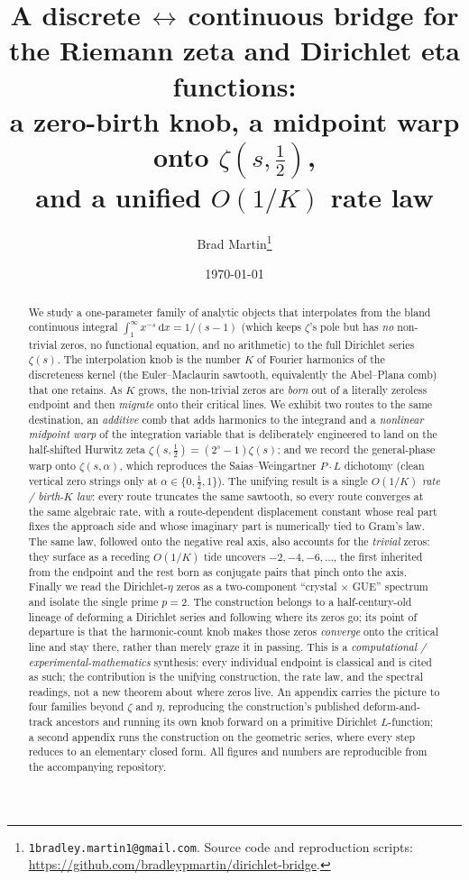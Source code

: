 \documentclass[11pt]{article}
\title{\bfseries A discrete\,$\leftrightarrow$\,continuous bridge for the
Riemann zeta and Dirichlet eta functions:\\
a zero-birth knob, a midpoint warp onto $\zeta(s,\tfrac12)$,\\
and a unified $O(1/K)$ rate law}
\author{Brad Martin\thanks{\texttt{1bradley.martin1@gmail.com}. Source code
and reproduction scripts: \url{https://github.com/bradleypmartin/dirichlet-bridge}.}}
\date{\today}
\theoremstyle{definition}
\newcommand{\dd}{\mathrm{d}}
\begin{document}
\maketitle

\begin{abstract}
We study a one-parameter family of analytic objects that interpolates from the
bland continuous integral $\int_1^\infty x^{-s}\,\dd x = 1/(s-1)$ (which keeps
$\zeta$'s pole but has \emph{no} non-trivial zeros, no functional equation, and no
arithmetic) to the full Dirichlet series $\zeta(s)$. The interpolation knob is
the number $K$ of Fourier harmonics of the discreteness kernel (the
Euler--Maclaurin sawtooth, equivalently the Abel--Plana comb) that one retains.
As $K$ grows, the non-trivial zeros are \emph{born} out of a literally zeroless
endpoint and then \emph{migrate} onto their critical lines. We exhibit two
routes to the same destination, an \emph{additive} comb that adds harmonics to
the integrand and a \emph{nonlinear midpoint warp} of the integration variable
that is deliberately engineered to land on the half-shifted Hurwitz zeta
$\zeta(s,\tfrac12) = (2^s-1)\zeta(s)$; and we record the general-phase warp
onto $\zeta(s,\alpha)$, which reproduces the Saias--Weingartner $P\cdot L$
dichotomy (clean vertical zero strings only at $\alpha\in\{0,\tfrac12,1\}$). The
unifying result is a single \emph{$O(1/K)$ rate / birth-$K$ law}: every route
truncates the same sawtooth, so every route converges at the same algebraic rate,
with a route-dependent displacement constant whose real part fixes the approach
side and whose imaginary part is numerically tied to Gram's law. The same law,
followed onto the negative real axis, also accounts for the \emph{trivial} zeros:
they surface as a receding $O(1/K)$ tide uncovers $-2,-4,-6,\dots$, the first
inherited from the endpoint and the rest born as conjugate pairs that pinch onto
the axis. Finally we read
the Dirichlet-$\eta$ zeros as a two-component ``crystal $\times$ GUE'' spectrum
and isolate the single prime $p=2$. The construction belongs to a half-century-old
lineage of deforming a Dirichlet series and following where its zeros go; its point
of departure is that the harmonic-count knob makes those zeros \emph{converge} onto
the critical line and stay there, rather than merely graze it in passing. This is a
\emph{computational / experimental-mathematics} synthesis: every individual endpoint
is classical and is cited as such; the contribution is the unifying construction, the
rate law, and the spectral readings, not a new theorem about where zeros live. An
appendix carries the picture to four families beyond $\zeta$ and $\eta$, reproducing
the construction's published deform-and-track ancestors and running its own knob
forward on a primitive Dirichlet $L$-function; a second appendix runs the
construction on the geometric series, where every step reduces to an elementary
closed form. All figures and numbers are reproducible from the accompanying
repository.
\end{abstract}
\end{document}
